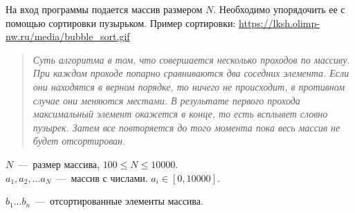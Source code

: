 На вход программы подается массив размером $N$. Необходимо упорядочить ее с помощью сортировки пузырьком.
Пример сортировки: \url{https://lksh.olimp-nw.ru/media/bubble_sort.gif}

\begin{quote}
\textit{Суть алгоритма в том, что совершается несколько проходов по массиву. 
При каждом проходе попарно сравниваются два соседних элемента. 
Если они находятся в верном порядке, то ничего не происходит, в противном случае они меняются местами. 
В результате первого прохода максимальный элемент окажется в конце, то есть всплывет словно пузырек. 
Затем все повторяется до того момента пока весь массив не будет отсортирован.}
\end{quote}

\InputFile

\noindent
$N$~---~размер массива, $100 \leq N \leq 10000$. \\
$a_1, a_2, \ldots a_N$~---~массив с числами. $ a_i \in [0, 10000]$. 

\OutputFile

\noindent
$b_1 ... b_n$~---~отсортированные элементы массива.

\SAMPLES
